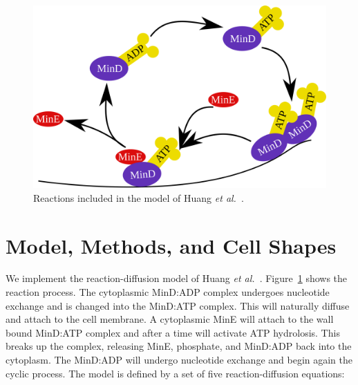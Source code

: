 \documentclass[letterpaper,twocolumn,amsmath,amssymb,pre]{revtex4-1}
\begin{document}
\begin{figure}
  \includegraphics[width=\columnwidth]{reactions}
  \caption{Reactions included in the model of Huang \emph{et
      al.}~\cite{huang2003dynamic}.}\label{fig:reactions}
\end{figure}


\section{Model, Methods, and Cell Shapes}\label{sec:model-method-shapes}
We implement the reaction-diffusion model of Huang \emph{et
  al.}~\cite{huang2003dynamic}.  Figure~\ref{fig:reactions} shows the
reaction process.  The cytoplasmic MinD:ADP complex undergoes
nucleotide exchange and is changed into the MinD:ATP complex.  This
will naturally diffuse and attach to the cell membrane.  A cytoplasmic
MinE will attach to the wall bound MinD:ATP complex and after a time
will activate ATP hydrolosis.  This breaks up the complex, releasing
MinE, phosphate, and MinD:ADP back into the cytoplasm.  The MinD:ADP
will undergo nucleotide exchange and begin again the cyclic process.
The model is defined by a set of five reaction-diffusion equations:
\end{document}
